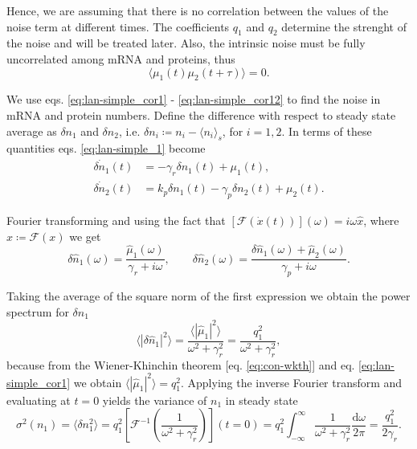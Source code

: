 Hence, we are assuming that there is no correlation between the values of the noise term at different times. The coefficients $q_1$ and $q_2$ determine the strenght of the noise and will be treated later. Also, the intrinsic noise must be fully uncorrelated among mRNA and proteins, thus
\begin{equation}
  \langle\mu_1(t)\mu_2(t+\tau)\rangle = 0. \label{eq:lan-simple_cor12}
\end{equation}

We use eqs. \eqref{eq:lan-simple_cor1} - \eqref{eq:lan-simple_cor12} to find the noise in mRNA and protein numbers. Define the difference with respect to steady state average as $\delta n_1$ and $\delta n_2$, i.e. $\delta n_i \coloneqq n_i - \langle n_i\rangle_s$, for $i=1,2$. In terms of these quantities eqs. \eqref{eq:lan-simple_1} become
\begin{align*}
  \dot{\delta n_1}(t) &= -\gamma_r\delta n_1(t) + \mu_1(t),\\
  \dot{\delta n_2}(t) &= k_p\delta n_1(t) -\gamma_p\delta n_2(t) + \mu_2(t).
\end{align*}

Fourier transforming and using the fact that $\left[\mathscr{F}(\dot{x}(t))\right](\omega) = i\omega \hat{x}$, where $\hat{x}\coloneqq\mathscr{F}(x)$ we get 
\begin{equation}
  \label{eq:lan-nfourier}
  \delta\hat{n}_1(\omega) = \frac{\hat{\mu}_1(\omega)}{\gamma_r+i\omega},\quad\quad \delta\hat{n}_2(\omega) = \frac{\delta\hat{n}_1(\omega) + \hat{\mu}_2(\omega)}{\gamma_p+i\omega}.
\end{equation}

Taking the average of the square norm of the first expression we obtain the power spectrum for $\delta n_1$
\begin{equation}
  \label{eq:lan-simple_psd1}
  \langle|\delta\hat{n}_1|^2\rangle = \frac{\langle|\hat{\mu}_1|^2\rangle}{\omega^2+\gamma_r^2} = \frac{q_1^2}{\omega^2+\gamma_r^2},
\end{equation}
because from the Wiener-Khinchin theorem [eq. \eqref{eq:con-wkth}] and eq. \eqref{eq:lan-simple_cor1} we obtain $\langle|\hat{\mu}_1|^2\rangle = q_1^2$. Applying the inverse Fourier transform and evaluating at $t=0$ yields the variance of $n_1$ in steady state
\begin{equation}
  \label{eq:lan-qrel1}
  \sigma^2(n_1) = \langle\delta n_1^2\rangle = q_1^2 \left[\mathscr{F}^{-1}\left(\frac{1}{\omega^2+\gamma_r^2}\right)\right](t=0) = q_1^2\int_{-\infty}^\infty\frac{1}{\omega^2+\gamma_r^2}\frac{\mathrm{d}\omega}{2\pi} = \frac{q_1^2}{2\gamma_r}.
\end{equation}

